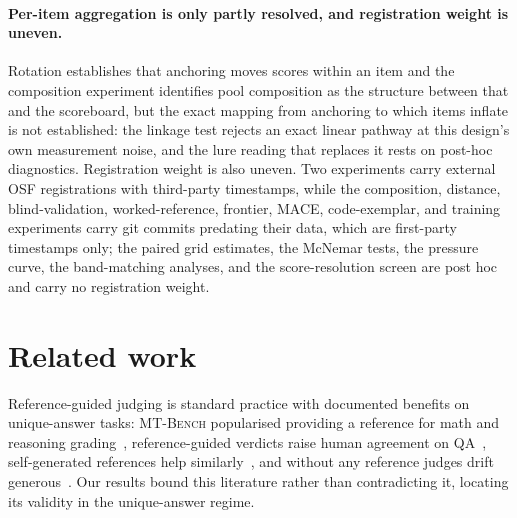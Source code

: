 \documentclass[11pt]{article}
\begin{document}
\paragraph{Per-item aggregation is only partly resolved, and registration weight is uneven.}
Rotation establishes that anchoring moves scores within an item and the composition experiment identifies pool composition as the structure between that and the scoreboard, but the exact mapping from anchoring to which items inflate is not established: the linkage test rejects an exact linear pathway at this design's own measurement noise, and the lure reading that replaces it rests on post-hoc diagnostics.
Registration weight is also uneven. Two experiments carry external OSF registrations with third-party timestamps, while the composition, distance, blind-validation, worked-reference, frontier, \textsc{MACE}, code-exemplar, and training experiments carry git commits predating their data, which are first-party timestamps only; the paired grid estimates, the McNemar tests, the pressure curve, the band-matching analyses, and the score-resolution screen are post hoc and carry no registration weight.

\section{Related work}

Reference-guided judging is standard practice with documented benefits on unique-answer tasks: \textsc{MT-Bench} popularised providing a reference for math and reasoning grading~\cite{zheng2023judging}, reference-guided verdicts raise human agreement on QA~\cite{refguided2024}, self-generated references help similarly~\cite{dobefore2025}, and without any reference judges drift generous~\cite{generous2026}.
Our results bound this literature rather than contradicting it, locating its validity in the unique-answer regime.
\end{document}
